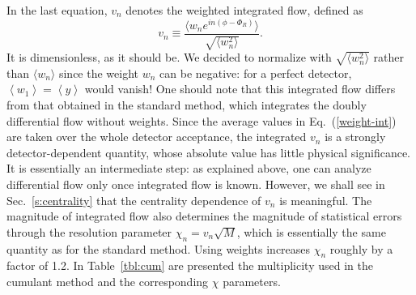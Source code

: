 \documentclass[aps,prc,superscriptaddress,showpacs,floatfix,nofootinbib]{revtex4}
\newcommand{\mean}[1]{\left\langle #1 \right\rangle}
\begin{document}
In the last equation, $v_n$ denotes the weighted integrated flow, 
defined as 
\begin{equation}
\label{weight-int}
v_n \equiv \frac{\langle w_n e^{in(\phi-\Phi_R)}\rangle}
{\sqrt{\langle w_n^2 \rangle}}. 
\end{equation}
It is dimensionless, as it should be.  We decided to normalize with
$\sqrt{\langle w_n^2\rangle}$ rather than $\langle w_n \rangle$ since
the weight $w_n$ can be negative: for a perfect detector,
$\mean{w_1}=\mean{y}$ would vanish!  One should note that this
integrated flow differs from that obtained in the standard method,
which integrates the doubly differential flow without weights.  Since
the average values in Eq.~(\ref{weight-int}) are taken over the whole
detector acceptance, the integrated $v_n$ is a strongly
detector-dependent quantity, whose absolute value has little physical
significance.  It is essentially an intermediate step: as explained
above, one can analyze differential flow only once integrated flow is
known.  However, we shall see in Sec.~\ref{s:centrality} that the
centrality dependence of $v_n$ is meaningful.  The magnitude of
integrated flow also determines the magnitude of statistical errors
through the resolution parameter $\chi_n=v_n\sqrt{M}$, which is
essentially the same quantity as for the standard method.  Using
weights increases $\chi_n$ roughly by a factor of 1.2.  In
Table~\ref{tbl:cum} are presented the multiplicity used in the
cumulant method and the corresponding $\chi$ parameters.
\end{document}
